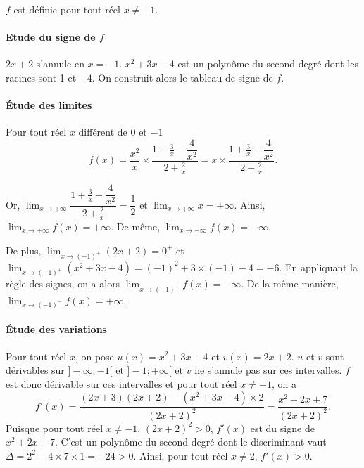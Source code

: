 \documentclass[11pt,fleqn, openany]{book} %
\begin{document}
\begin{solution}$f$ est définie pour tout réel $x\neq-1$.


\paragraph{Etude du signe de $f$}

$2x+2$ s'annule en $x=-1$. $x^2+3x-4$ est un polynôme du second degré dont les racines sont 1 et $-4$. On construit alors le tableau de signe de $f$.

\begin{center}
\end{center}


\paragraph{Étude des limites}


Pour tout réel $x$ différent de 0 et $-1$
\[f(x)=\dfrac{x^2}{x} \times \dfrac{1+\frac{3}{x}-\dfrac{4}{x^2}}{2+\frac{2}{x}}=x \times  \dfrac{1+\frac{3}{x}-\dfrac{4}{x^2}}{2+\frac{2}{x}}.\]

Or, $\displaystyle \lim_{x \to +\infty} \dfrac{1+\frac{3}{x}-\dfrac{4}{x^2}}{2+\frac{2}{x}}=\dfrac{1}{2}$ et $\displaystyle \lim_{x \to +\infty}x=+\infty$. Ainsi, $\displaystyle \lim_{x\to +\infty}f(x)=+\infty$. De même, $\displaystyle \lim_{x\to -\infty}f(x)=-\infty$.

De plus, $\displaystyle \lim_{x \to (-1)^+} (2x+2)=0^+$ et $\displaystyle \lim_{x \to (-1)^+} (x^2+3x-4)=(-1)^2+3\times(-1)-4=-6$. En appliquant la règle des signes, on a alors $\displaystyle \lim_{x \to (-1)^+}f(x)=-\infty$.  De la même manière, $\displaystyle \lim_{x \to (-1)^-}f(x)=+\infty$.

\paragraph{Étude des variations}

Pour tout réel $x$, on pose $u(x)=x^2+3x-4$ et $v(x)=2x+2$. $u$ et $v$ sont dérivables sur $]-\infty;-1[$ et $]-1;+\infty[$ et $v$ ne s'annule pas sur ces intervalles. $f$ est donc dérivable sur ces intervalles et pour tout réel $x\neq -1$, on a
\[f'(x)=\dfrac{(2x+3)(2x+2)-(x^2+3x-4) \times 2}{(2x+2)^2}=\dfrac{x^2+2x+7}{(2x+2)^2}.\]
Puisque pour tout réel $x\neq -1$, $(2x+2)^2>0$, $f'(x)$ est du signe de $x^2+2x+7$. C'est un polynôme du second degré dont le discriminant vaut $\Delta = 2^2-4 \times 7 \times 1 = -24 >0$. Ainsi, pour tout réel $x\neq 2$, $f'(x)>0$.


\end{solution}
\end{document}
